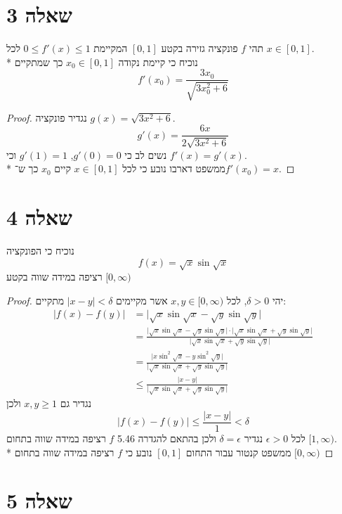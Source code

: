 \section{שאלה 3}
תהי $f$ פונקציה גזירה בקטע $[0, 1]$ המקיימת $0 \le f'(x) \le 1$ לכל $x \in [0, 1]$. \\*
נוכיח כי קיימת נקודה $x_0 \in [0, 1]$ כך שמתקיים
\[
	f'(x_0) = \frac{3x_0}{\sqrt{3x_0^2 + 6}}
\]
\begin{proof}
	נגדיר פונקציה $g(x) = \sqrt{3x^2 + 6}$.
	\[
		g'(x) = \frac{6x}{2\sqrt{3x^2 + 6}}
	\]
	נשים לב כי $g'(0) = 0$, $g'(1) = 1$ וכי $f'(x) = g'(x)$. \\*
	ממשפט דארבו נובע כי לכל $x \in [0, 1]$ קיים $x_0$ כך ש־$f'(x_0) = x$.
\end{proof}

\section{שאלה 4}
נוכיח כי הפונקציה
\[
	f(x) = \sqrt{x} \sin \sqrt{x}
\]
רציפה במידה שווה בקטע $[0, \infty)$ %
\begin{proof}
	יהי $\delta > 0$, לכל $x, y \in [0, \infty)$ אשר מקיימים $\lvert x - y \rvert < \delta$ מתקיים: %
	\begin{align*}
		\lvert f(x) - f(y) \rvert
		& = \lvert \sqrt{x} \sin \sqrt{x} - \sqrt{y} \sin \sqrt{y} \rvert \\
		& = \frac{\lvert\sqrt{x} \sin \sqrt{x} - \sqrt{y} \sin \sqrt{y}\rvert \cdot \lvert\sqrt{x} \sin \sqrt{x} + \sqrt{y} \sin \sqrt{y}\rvert}
			{\lvert\sqrt{x} \sin \sqrt{x} + \sqrt{y} \sin \sqrt{y} \rvert} \\
		& = \frac{\lvert x \sin^2 \sqrt{x} - y \sin^2 \sqrt{y}\rvert}{\lvert \sqrt{x} \sin \sqrt{x} + \sqrt{y} \sin \sqrt{y}\rvert} \\
		& \le \frac{\lvert x - y \rvert } {\lvert \sqrt{x} \sin \sqrt{x} + \sqrt{y} \sin \sqrt{y}\rvert}
	\end{align*}
	נגדיר גם $x, y \ge 1$ ולכן
	\[
		\lvert f(x) - f(y) \rvert
		\le \frac{\lvert x - y \rvert } {1}
		< \delta
	\]
	לכל $\epsilon > 0$ נגדיר $\delta = \epsilon$ ולכן בהתאם להגדרה 5.46 $f$ רציפה במידה שווה בתחום $[1, \infty)$. \\* %
	ממשפט קנטור עבור התחום $[0, 1]$ נובע כי $f$ רציפה במידה שווה בתחום $[0, \infty)$ %
\end{proof}

\section{שאלה 5}
